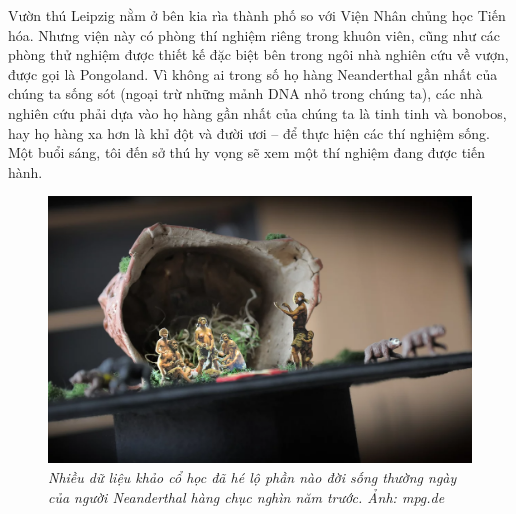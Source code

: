 \begin{multicols}{2}
	Vườn thú Leipzig nằm ở bên kia rìa thành phố so với Viện Nhân chủng học Tiến hóa. Nhưng viện này có phòng thí nghiệm riêng trong khuôn viên, cũng như các phòng thử nghiệm được thiết kế đặc biệt bên trong ngôi nhà nghiên cứu về vượn, được gọi là Pongoland. Vì không ai trong số họ hàng Neanderthal gần nhất của chúng ta sống sót (ngoại trừ những mảnh DNA nhỏ trong chúng ta), các nhà nghiên cứu phải dựa vào họ hàng gần nhất của chúng ta là tinh tinh và bonobos, hay họ hàng xa hơn là khỉ đột và đười ươi -- để thực hiện các thí nghiệm sống. Một buổi sáng, tôi đến sở thú hy vọng sẽ xem một thí nghiệm đang được tiến hành.
	\begin{figure}[H]
		\vspace*{-5pt}
		\centering
		\captionsetup{labelformat= empty, justification=centering}
		\includegraphics[width= 1\linewidth]{4}
		\caption{\small\textit{\color{timhieukhoahoc}Nhiều dữ liệu khảo cổ học đã hé lộ phần nào đời sống thường ngày của người Neanderthal hàng chục nghìn năm trước. Ảnh: mpg.de}}
		\vspace*{-5pt}
	\end{figure}

\end{multicols}
